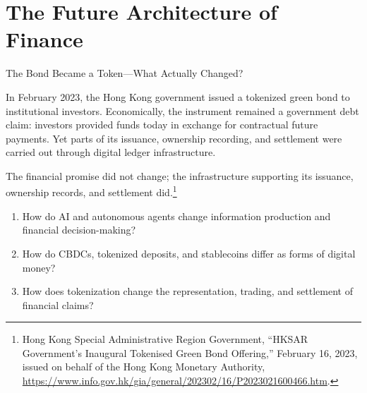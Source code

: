 \chapter{The Future Architecture of Finance}
\label{chap:The_Future_Architecture_of_Finance}

\begin{openingcase}{The Bond Became a Token---What Actually Changed?}

In February 2023, the Hong Kong government issued a tokenized green bond to institutional investors. Economically, the instrument remained a government debt claim: investors provided funds today in exchange for contractual future payments. Yet parts of its issuance, ownership recording, and settlement were carried out through digital ledger infrastructure.

The financial promise did not change; the infrastructure supporting its issuance, ownership records, and settlement did.\footnote{Hong Kong Special Administrative Region Government, ``HKSAR Government's Inaugural Tokenised Green Bond Offering,'' February 16, 2023, issued on behalf of the Hong Kong Monetary Authority, \url{https://www.info.gov.hk/gia/general/202302/16/P2023021600466.htm}.}

\end{openingcase}


\begin{tcolorbox}[
  enhanced,
  colback=FinanceBlue!6,
  colframe=FinanceBlue,
  boxrule=0.6pt,
  sharp corners,
  left=8pt,
  right=8pt,
  top=7pt,
  bottom=7pt,
  before skip=1em,
  after skip=1.6em,
  title=\textbf{Core Questions},
  coltitle=white,
  colbacktitle=FinanceBlue,
  fonttitle=\bfseries,
  attach boxed title to top left={xshift=6pt,yshift=-2mm},
  boxed title style={
    boxrule=0pt,
    sharp corners,
    left=5pt,
    right=5pt,
    top=2pt,
    bottom=2pt
  }
]
\begin{enumerate}[
  leftmargin=*,
  label=\textcolor{FinanceBlue}{\textbf{\arabic*.}},
  itemsep=0.55em,
  topsep=0.2em
]


\item How do AI and autonomous agents change information production and financial decision-making?

\item How do CBDCs, tokenized deposits, and stablecoins differ as forms of digital money?

\item How does tokenization change the representation, trading, and settlement of financial claims?


\end{enumerate}
\end{tcolorbox}


